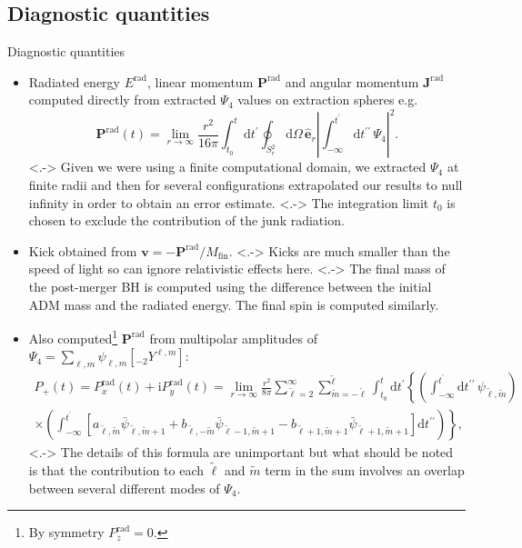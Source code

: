 \documentclass[smaller,aspectratio=169]{beamer}
\newcommand{\rad}{\mathrm{rad}}
\newcommand{\tl}{\tilde{\ell}}
\newcommand{\tm}{\tilde{m}}
\newcommand{\rmd}{\mathrm{d}}
\begin{document}
\subsection{Diagnostic quantities}
\begin{frame}{Diagnostic quantities}
	\begin{itemize}
		\item<+->
			Radiated energy $E^{\rad}$, 
			linear momentum $\mathbf{P}^{\rad}$ and 
			angular momentum $\mathbf{J}^{\rad}$ computed \alert{directly} 
			from extracted $\Psi_4$ values on extraction spheres e.g.
			\begin{equation}
				\mathbf{P}^{\rad}(t) = \lim_{r\to\infty}\frac{r^2}{16\pi}
				\int_{t_0}^t\rmd t^\prime\oint_{S^2_r}\rmd\Omega\,
				\hat{\mathbf{e}}_r\left|\int_{-\infty}^{t^\prime}\rmd t^{\prime\prime}\,
				\Psi_4\right|^2.
				\label{eq:Prad}
			\end{equation}
        \note[item]<.->{
            Given we were using a finite computational domain, we extracted 
            $\Psi_4$ at finite radii and then for several configurations
            extrapolated our results to null infinity in order to obtain an
            error estimate.}
        \note[item]<.->{
            The integration limit $t_0$ is chosen to exclude the contribution
            of the junk radiation.}
		\item<+->
			Kick obtained from $\mathbf{v}=-\mathbf{P}^{\rad}/M_{\text{fin}}$.
        \note[item]<.->{
            Kicks are much smaller than the speed of light so can ignore
            relativistic effects here.}
        \note[item]<.->{
            The final mass of the post-merger BH is computed using the 
            difference between the initial ADM mass and the radiated energy. The 
            final spin is computed similarly.}
		\item<+->
			Also computed\footnote{By symmetry $P^\rad_z=0$.} 
			$\mathbf{P}^{\rad}$
			from multipolar amplitudes of $\Psi_4=\sum_{\ell,m}\psi_{\ell,m}\left[{}_{-2}Y^{\ell,m}\right]$:
			\begin{multline}
				P_+(t) = P^\rad_x(t) + \mathrm{i}P^\rad_y(t)
				 = \lim_{r\to\infty}\frac{r^2}{8\pi}\sum_{\tl=2}^{\infty}
				 \sum_{\tm=-\tl}^{\tl}\int_{t_0}^t\rmd t^{\prime}
				\left\{\left(\int^{t^\prime}_{-\infty}\rmd t^{\prime\prime}\, 
				\psi_{\tl,\tm}\right)\right.\\
				\left.\times\left(\int_{-\infty}^{t^\prime} 
				\left[a_{\tl,\tm}\bar{\psi}_{\tl,\tm+1}+ 
				b_{\tl,-\tm}\bar{\psi}_{\tl-1,\tm+1}-
				b_{\tl+1,\tm+1}\bar{\psi}_{\tl+1,\tm+1}\right]
				\rmd t^{\prime\prime}\right)\right\},
				\label{eq:P+rad}
			\end{multline}
        \note[item]<.->{
            The details of this formula are unimportant but what should be noted
            is that the contribution to each $\tilde{\ell}$ and $\tilde{m}$ 
            term in the sum involves an overlap between several different modes
            of $\Psi_4$.}
			\vspace{0.5 em}
	\end{itemize}

\end{frame}
\end{document}
